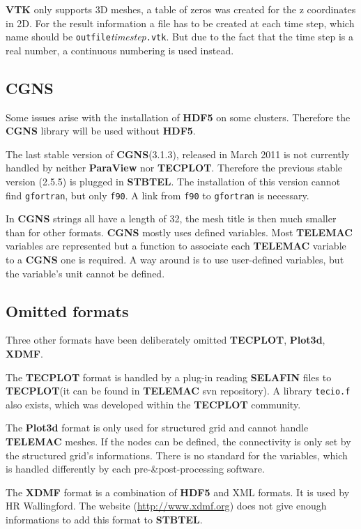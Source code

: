 \documentclass[a4paper,10pt]{article}
\newcommand{\tel}{\textbf{TELEMAC}\xspace}
\newcommand{\stb}{\textbf{STBTEL}\xspace}
\newcommand{\slf}{\textbf{SELAFIN}\xspace}
\newcommand{\vtk}{\textbf{VTK}\xspace}
\newcommand{\cgns}{\textbf{CGNS}\xspace}
\newcommand{\tecplot}{\textbf{TECPLOT}\xspace}
\newcommand{\hdf}{\textbf{HDF5}\xspace}
\begin{document}
\vtk only supports 3D meshes, a table of zeros was created for the z
coordinates in 2D.  For the result information a file has to be created at each
time step, which name should be \verb+outfile+\textit{timestep}\verb+.vtk+. But
due to the fact that the time step is a real number, a continuous numbering is
used instead. 

\subsection{\cgns}
Some issues arise with the installation of \hdf on some clusters.  Therefore
the \cgns library will be used without \hdf. 

The last stable version of \cgns (3.1.3), released in March 2011 is not
currently handled by neither \textbf{ParaView} nor \tecplot. Therefore the
previous stable version (2.5.5) is plugged in \stb. The installation of this
version cannot find \verb+gfortran+, but only \verb+f90+.  A link from
\verb+f90+ to \verb+gfortran+ is necessary.

In \cgns strings all have a length of 32, the mesh title is then much smaller
than for other formats.  \cgns mostly uses defined variables. Most \tel
variables are represented but a function to associate each \tel variable to a
\cgns one is required. A way around is to use user-defined variables, but the
variable's unit cannot be defined.



\subsection{Omitted formats}

Three other formats have been deliberately omitted \tecplot, \textbf{Plot3d},
\textbf{XDMF}.

The \tecplot format is handled by a plug-in reading \slf files to \tecplot (it
can be found in \tel svn repository). A library \verb+tecio.f+ also exists,
which was developed within the \tecplot community. 

The \textbf{Plot3d} format is only used for structured grid and cannot handle
\tel meshes.  If the nodes can be defined, the connectivity is only set by the
structured grid's informations.  There is no standard for the variables, which
is handled differently by each pre-\&post-processing software.

The \textbf{XDMF} format is a combination of \hdf and XML formats.  It is used
by HR Wallingford. The website (\url{http://www.xdmf.org}) does not give enough
informations to add this format to \stb.
\end{document}
